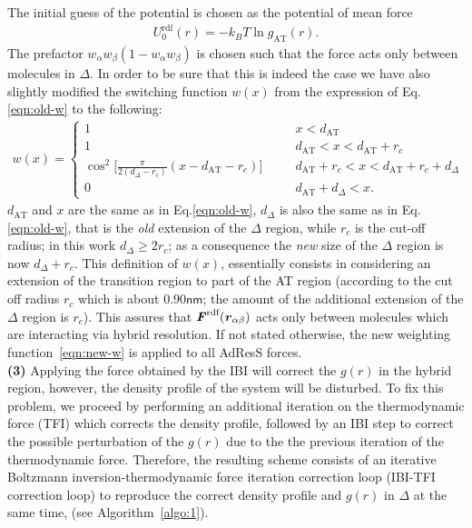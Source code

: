 \documentclass[aps,pre,preprint]{revtex4}
\newcommand{\recheck}[1]{{\color{red} #1}}
\newcommand{\redc}[1]{{\color{red} #1}}
\renewcommand{\v}[1]{\textbf{\textit{#1}}}
\begin{document}
The initial guess of the potential is chosen as the
potential of mean force
\begin{align}\label{eqn:pmf}
  U^{\textrm{rdf}}_0(r) = -k_BT \ln g_{\textrm{AT}}(r).
\end{align} 
The prefactor $ w_\alpha w_\beta (1-w_\alpha w_\beta)$ is chosen such that the force acts only between molecules in $\Delta$. In order to be sure that this is indeed the case we have also slightly modified the switching function $w(x)$ from the expression of Eq.\ref{eqn:old-w} to the following:
\begin{align}\label{eqn:new-w}
  w(x) =
  \left\{
    \begin{array}{lcl}
      1 &\quad& x < d_{\textrm{AT}}\\
      1  && d_{\textrm{AT}} < x < d_{\textrm{AT}} + r_c\\
      \cos^2\big[\frac{\pi}{2(d_{{\Delta}} - r_c)} (x - d_{\textrm{AT}} - r_c)\big] && d_{\textrm{AT}} + r_c < x < d_{\textrm{AT}} +  r_c + d_{{\Delta}} \\
      0 && d_{\textrm{AT}} + d_{{\Delta}}  < x.
    \end{array}
  \right.
\end{align}
\redc{$d_{\textrm{AT}}$ and $x$ are the same as in  Eq.\ref{eqn:old-w}, $d_{{\Delta}}$ is also the same as in Eq.\ref{eqn:old-w}, that is the {\it old} extension of the $\Delta$ region, while $r_c$ is the cut-off
  radius; in this work $d_{{\Delta}} \geq 2r_c$; as a consequence the {\it new} size of the $\Delta$ region is now $d_{{\Delta}}+r_c$}.  This definition of $w(x)$, essentially consists in considering an extension of the transition region to part of the AT region (according to the cut off radius $r_c$ which is about $0.90\textsf{nm}$; \redc{the amount of the additional extension of the $\Delta$ region is $r_{c}$}). This assures that $\v F^{\textrm{rdf}}(\v r_{\alpha\beta})$ acts only between molecules which are interacting via hybrid resolution.
\recheck{If not stated otherwise, the new weighting function~\eqref{eqn:new-w}
  is applied to all AdResS forces.}
\\
{\bf (3)}  Applying the force obtained by the IBI will correct the $g(r)$ in the hybrid region, however,
the density profile of the system will be disturbed.
To fix this problem, we proceed by performing an additional iteration on the thermodynamic force (TFI) which corrects the density profile,
followed by an IBI step to correct the possible perturbation
of the $g(r)$ due to the the previous iteration of the thermodynamic force.
Therefore, the resulting scheme consists of an iterative
Boltzmann inversion-thermodynamic force iteration correction loop
(IBI-TFI correction loop) to reproduce the correct density
profile and $g(r)$ in $\Delta$ at the same time, (see Algorithm~\ref{algo:1}). 
\end{document}

